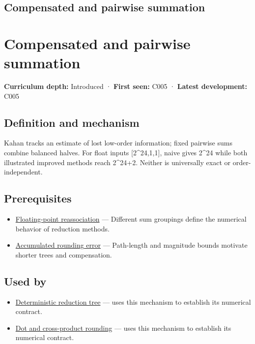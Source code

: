 \hypertarget{appendix-df318da57389}{}
\section*{Compensated and pairwise summation}
\chapter{Compensated and pairwise summation}\label{appendix-df318da57389-compensated-and-pairwise-summation}

\textbf{Curriculum depth:} Introduced · \textbf{First seen:} C005 · \textbf{Latest development:} C005

\section{Definition and mechanism}\label{appendix-df318da57389-definition-and-mechanism}

Kahan tracks an estimate of lost low-order information; fixed pairwise sums combine balanced halves. For float inputs {[}2\^{}24,1,1{]}, naive gives 2\^{}24 while both illustrated improved methods reach 2\^{}24+2. Neither is universally exact or order-independent.

\section{Prerequisites}\label{appendix-df318da57389-prerequisites}

\begin{itemize}
\tightlist
\item
  \hyperref[appendix-c2ac4a84c283]{Floating-point reassociation} --- Different sum groupings define the numerical behavior of reduction methods.
\item
  \hyperref[appendix-f82e270791c8]{Accumulated rounding error} --- Path-length and magnitude bounds motivate shorter trees and compensation.
\end{itemize}

\section{Used by}\label{appendix-df318da57389-used-by}

\begin{itemize}
\tightlist
\item
  \hyperref[appendix-4c8e0238e7ee]{Deterministic reduction tree} --- uses this mechanism to establish its numerical contract.
\item
  \hyperref[appendix-5aef4f13483a]{Dot and cross-product rounding} --- uses this mechanism to establish its numerical contract.
\end{itemize}

